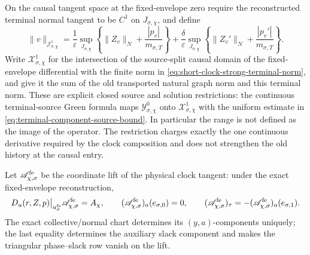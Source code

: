 \begin{corollary}
On the causal tangent space at the fixed-envelope zero require the
reconstructed terminal normal tangent to be \(C^1\) on
\(J_{\sigma,\chi}\), and define
\begin{equation}
 \|v\|_{\mathcal J_{\sigma,\chi}^1}
 =\frac1\varepsilon\sup_{J_{\sigma,\chi}}
   \left\{\|Z_v\|_N+\frac{|p_v|}{m_{\sigma,T}}\right\}
 +\frac\delta\varepsilon\sup_{J_{\sigma,\chi}}
   \left\{\|Z_v'\|_N+\frac{|p_v'|}{m_{\sigma,T}}\right\}.
                                                        \label{eq:short-clock-strong-terminal-norm}
\end{equation}
Write \(\mathcal X_{\sigma,\chi}^1\) for the intersection of the
source-split causal domain of the fixed-envelope differential with the
finite norm in \cref{eq:short-clock-strong-terminal-norm}, and give it the
sum of the old transported natural graph norm and this terminal norm.
These are explicit closed source and solution restrictions: the continuous
terminal-source Green formula maps \(\mathcal Y_{\sigma,\chi}^0\) onto
\(\mathcal X_{\sigma,\chi}^1\) with the uniform estimate in
\cref{eq:terminal-component-source-bound}.  In particular the range is not
defined as the image of the operator.  The restriction charges exactly
the one continuous derivative required by the clock composition and does
not strengthen the old history at the causal entry.

Let \(\mathscr A_{\chi,\sigma}^{\rm fe}\) be the coordinate lift of the
physical clock tangent: under the exact fixed-envelope reconstruction,
\begin{equation}
 D_u(r,Z,p)\big|_{u_\sigma^{\rm fe}}
       \mathscr A_{\chi,\sigma}^{\rm fe}=A_\chi,\qquad
 (\mathscr A_{\chi,\sigma}^{\rm fe})_a(e_{\sigma,0})=0,\qquad
 (\mathscr A_{\chi,\sigma}^{\rm fe})_\tau
 =-(\mathscr A_{\chi,\sigma}^{\rm fe})_a(e_{\sigma,1}).   \label{eq:slow-clock-coordinate-lift}
\end{equation}
The exact collective/normal chart determines its \((y,a)\)-components
uniquely; the last equality determines the auxiliary slack component and
makes the triangular phase--slack row vanish on the lift.


\end{corollary}
